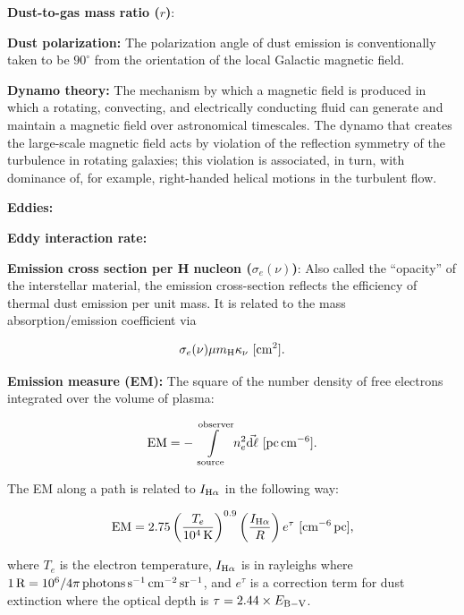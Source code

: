 \documentclass[a4paper,10pt]{article}
\begin{document}
{\noindent}\textbf{Dust-to-gas mass ratio ($r$)}: 

{\noindent}\textbf{Dust polarization:} The polarization angle of dust emission is conventionally taken to be $90^\circ$ from the orientation of the local Galactic magnetic field.

{\noindent}\textbf{Dynamo theory:} The mechanism by which a magnetic field is produced in which a rotating, convecting, and electrically conducting fluid can generate and maintain a magnetic field over astronomical timescales. The dynamo that creates the large-scale magnetic field acts by violation of the reflection symmetry of the turbulence in rotating galaxies; this violation is associated, in turn, with dominance of, for example, right-handed helical motions in the turbulent flow.

{\noindent}\textbf{Eddies:}

{\noindent}\textbf{Eddy interaction rate:}

{\noindent}\textbf{Emission cross section per H nucleon ($\sigma_e(\nu)$)}: Also called the ``opacity'' of the interstellar material, the emission cross-section reflects the efficiency of thermal dust emission per unit mass. It is related to the mass absorption/emission coefficient via

\begin{align*}
    \sigma_e(\nu) \mu m_{\rm H}\kappa_\nu ~ [{\rm cm^2}].
\end{align*}

{\noindent}\textbf{Emission measure (EM):} The square of the number density of free electrons integrated over the volume of plasma:

\begin{align*}
    {\rm EM} = -\int\limits_\mathrm{source}^\mathrm{observer} n_e^2\vec{{\rm d}\ell} ~ [{\rm pc\,cm^{-6}}].
\end{align*}

{\noindent}The EM along a path is related to $I_{\rm H\alpha}$ in the following way:

\begin{align*}
    {\rm EM} = 2.75 \left(\frac{T_e}{10^4\,{\rm K}}\right)^{0.9} \left(\frac{I_{\rm H\alpha}}{R}\right) e^\tau ~ [{\rm cm^{-6}\,pc}],
\end{align*}

{\noindent}where $T_e$ is the electron temperature, $I_{\rm H\alpha}$ is in rayleighs where $1\,{\rm R} = 10^6/4\pi\,{\rm photons\,s^{-1}\,cm^{-2}\,sr^{-1}}$, and $e^\tau$ is a correction term for dust extinction where the optical depth is $\tau=2.44\times E_{\rm B-V}$.
\end{document}
